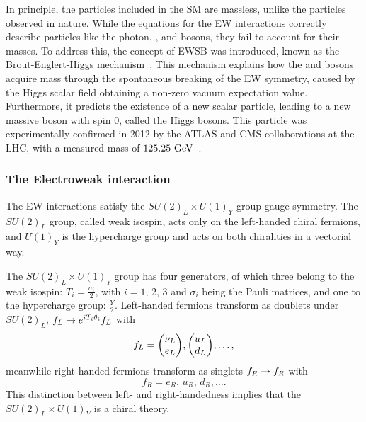 In principle, the particles included in the \ac{SM} are massless, unlike the particles observed in nature. While the equations for the \ac{EW} interactions correctly describe particles like the photon, \Wboson, and \Zboson bosons, they fail to account for their masses. To address this, the concept of \ac{EWSB} was introduced, known as the Brout-Englert-Higgs mechanism~\cite{Higgs-1964_1,Higgs-1964_2,Higgs-1966,Englert_Brout-1964}. This mechanism explains how the \Wboson and \Zboson bosons acquire mass through the spontaneous breaking of the \ac{EW} symmetry, caused by the Higgs scalar field obtaining a non-zero vacuum expectation value. Furthermore, it predicts the existence of a new scalar particle, leading to a new massive boson with spin 0, called the Higgs bosons. This particle was experimentally confirmed in 2012 by the \ac{ATLAS} and \ac{CMS} collaborations at the \ac{LHC}, with a measured mass of \(125.25~\text{GeV}\)~\cite{ATLAS-HiggsObservation,CMS-HiggsObservation}.








\subsubsection{The Electroweak interaction}
\label{subsubsec:theory:sm:mathematical:ew}


The \ac{EW} interactions satisfy the \(SU(2)_L \times U(1)_Y\) group gauge symmetry. The \(SU(2)_L\) group, called weak isospin, acts only on the left-handed chiral fermions, and \(U(1)_Y\) is the hypercharge group and acts on both chiralities in a vectorial way.

The \(SU(2)_L \times U(1)_Y\) group has four generators, of which three belong to the weak isospin: \(T_i = \frac{\sigma_i}{2}\), with \(i = 1,\, 2,\, 3\) and \(\sigma_i\) being the Pauli matrices, and one to the hypercharge group: \(\frac{Y}{2}\). Left-handed fermions transform as doublets under \(SU(2)_L\), \(f_L \rightarrow e^{i T_i \theta_i} f_L\) with
\begin{equation}
    f_L = \mqty( \nu_L\\ e_L ), \mqty( u_L\\ d_L ), \dots,
\end{equation}
meanwhile right-handed fermions transform as singlets \(f_R \rightarrow f_R\) with
\begin{equation}
    f_R = e_R, \, u_R,\, d_R, \dots.
\end{equation}
This distinction between left- and right-handedness implies that the \(SU(2)_L \times U(1)_Y\) is a chiral theory.

